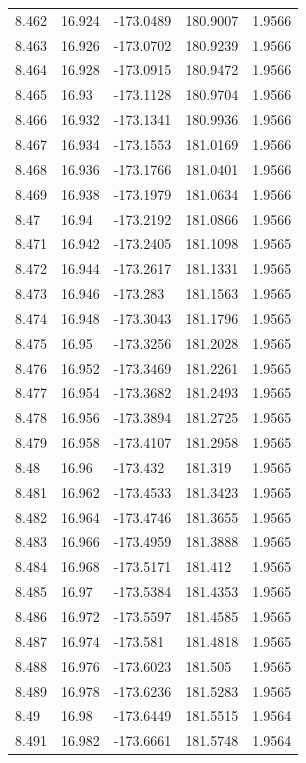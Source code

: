 \begin{tabular}{lllll}
8.462 & 16.924 & -173.0489 & 180.9007 & 1.9566 \\
8.463 & 16.926 & -173.0702 & 180.9239 & 1.9566 \\
8.464 & 16.928 & -173.0915 & 180.9472 & 1.9566 \\
8.465 & 16.93 & -173.1128 & 180.9704 & 1.9566 \\
8.466 & 16.932 & -173.1341 & 180.9936 & 1.9566 \\
8.467 & 16.934 & -173.1553 & 181.0169 & 1.9566 \\
8.468 & 16.936 & -173.1766 & 181.0401 & 1.9566 \\
8.469 & 16.938 & -173.1979 & 181.0634 & 1.9566 \\
8.47 & 16.94 & -173.2192 & 181.0866 & 1.9566 \\
8.471 & 16.942 & -173.2405 & 181.1098 & 1.9565 \\
8.472 & 16.944 & -173.2617 & 181.1331 & 1.9565 \\
8.473 & 16.946 & -173.283 & 181.1563 & 1.9565 \\
8.474 & 16.948 & -173.3043 & 181.1796 & 1.9565 \\
8.475 & 16.95 & -173.3256 & 181.2028 & 1.9565 \\
8.476 & 16.952 & -173.3469 & 181.2261 & 1.9565 \\
8.477 & 16.954 & -173.3682 & 181.2493 & 1.9565 \\
8.478 & 16.956 & -173.3894 & 181.2725 & 1.9565 \\
8.479 & 16.958 & -173.4107 & 181.2958 & 1.9565 \\
8.48 & 16.96 & -173.432 & 181.319 & 1.9565 \\
8.481 & 16.962 & -173.4533 & 181.3423 & 1.9565 \\
8.482 & 16.964 & -173.4746 & 181.3655 & 1.9565 \\
8.483 & 16.966 & -173.4959 & 181.3888 & 1.9565 \\
8.484 & 16.968 & -173.5171 & 181.412 & 1.9565 \\
8.485 & 16.97 & -173.5384 & 181.4353 & 1.9565 \\
8.486 & 16.972 & -173.5597 & 181.4585 & 1.9565 \\
8.487 & 16.974 & -173.581 & 181.4818 & 1.9565 \\
8.488 & 16.976 & -173.6023 & 181.505 & 1.9565 \\
8.489 & 16.978 & -173.6236 & 181.5283 & 1.9565 \\
8.49 & 16.98 & -173.6449 & 181.5515 & 1.9564 \\
8.491 & 16.982 & -173.6661 & 181.5748 & 1.9564 \\

\end{tabular}
